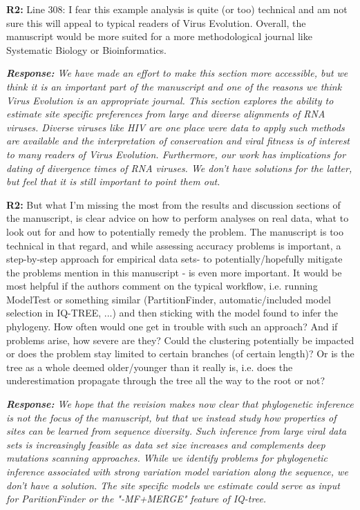\documentclass[aps,rmp,onecolumn]{revtex4-1}
\newcommand{\refb}[1]{\textbf{R2:} #1}
\newcommand{\response}[1]{{\it {\color{response}\textbf{Response:} #1}}}
\begin{document}
\refb{Line 308: I fear this example analysis is quite (or too) technical and am not sure this will appeal to typical readers of Virus Evolution. Overall, the manuscript would be more suited for a more methodological journal like Systematic Biology or Bioinformatics.}

\response{We have made an effort to make this section more accessible, but we think it is an important part of the manuscript and one of the reasons we think Virus Evolution is an appropriate journal.
This section explores the ability to estimate site specific preferences from large and diverse alignments of RNA viruses.
Diverse viruses like HIV are one place were data to apply such methods are available and the interpretation of conservation and viral fitness is of interest to many readers of Virus Evolution.
Furthermore, our work has implications for dating of divergence times of RNA viruses.
We don't have solutions for the latter, but feel that it is still important to point them out.
}


\refb{But what I’m missing the most from the results and discussion sections of the manuscript, is clear advice on how to perform analyses on real data, what to look out for and how to potentially remedy the problem. The manuscript is too technical in that regard, and while assessing accuracy problems is important, a step-by-step approach for empirical data sets- to potentially/hopefully mitigate the problems mention in this manuscript - is even more important. It would be most helpful if the authors comment on the typical workflow, i.e. running ModelTest or something similar (PartitionFinder, automatic/included model selection in IQ-TREE, ...) and then sticking with the model found to infer the phylogeny. How often would one get in trouble with such an approach? And if problems arise, how severe are they? Could the clustering potentially be impacted or does the problem stay limited to certain branches (of certain length)? Or is the tree as a whole deemed older/younger than it really is, i.e. does the underestimation propagate through the tree all the way to the root or not?}

\response{
We hope that the revision makes now clear that phylogenetic inference is not the focus of the manuscript, but that we instead study how properties of sites can be learned from sequence diversity.
Such inference from large viral data sets is increasingly feasible as data set size increases and complements deep mutations scanning approaches.
While we identify problems for phylogenetic inference associated with strong variation model variation along the sequence, we don't have a solution.
The site specific models we estimate could serve as input for ParitionFinder or the "-MF+MERGE" feature of IQ-tree.
}
\end{document}
